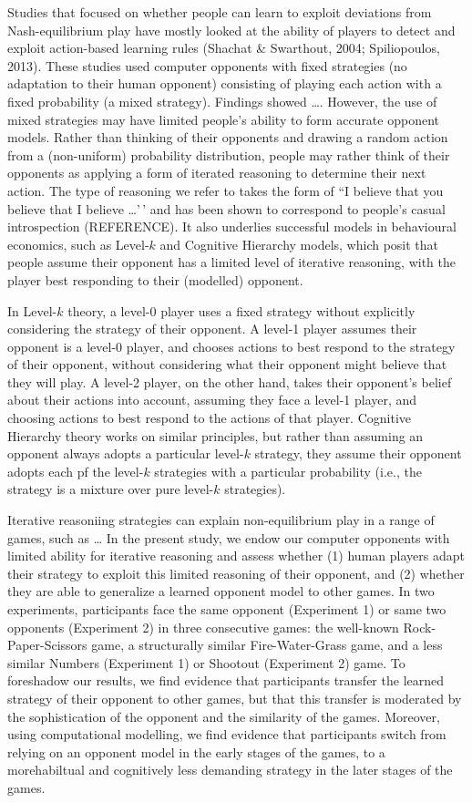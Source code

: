 \documentclass[
  english,
  man,floatsintext]{apa6}
\begin{document}
Studies that focused on whether people can learn to exploit deviations from Nash-equilibrium play have mostly looked at the ability of players to detect and exploit action-based learning rules (Shachat \& Swarthout, 2004; Spiliopoulos, 2013). These studies used computer opponents with fixed strategies (no adaptation to their human opponent) consisting of playing each action with a fixed probability (a mixed strategy). Findings showed \ldots. However, the use of mixed strategies may have limited people's ability to form accurate opponent models. Rather than thinking of their opponents and drawing a random action from a (non-uniform) probability distribution, people may rather think of their opponents as applying a form of iterated reasoning to determine their next action. The type of reasoning we refer to takes the form of ``I believe that you believe that I believe \ldots'\,' and has been shown to correspond to people's casual introspection (REFERENCE). It also underlies successful models in behavioural economics, such as Level-\(k\) and Cognitive Hierarchy models, which posit that people assume their opponent has a limited level of iterative reasoning, with the player best responding to their (modelled) opponent.

In Level-\(k\) theory, a level-0 player uses a fixed strategy without explicitly considering the strategy of their opponent. A level-1 player assumes their opponent is a level-0 player, and chooses actions to best respond to the strategy of their opponent, without considering what their opponent might believe that they will play. A level-2 player, on the other hand, takes their opponent's belief about their actions into account, assuming they face a level-1 player, and choosing actions to best respond to the actions of that player. Cognitive Hierarchy theory works on similar principles, but rather than assuming an opponent always adopts a particular level-\(k\) strategy, they assume their opponent adopts each pf the level-\(k\) strategies with a particular probability (i.e., the strategy is a mixture over pure level-\(k\) strategies).

Iterative reasoniing strategies can explain non-equilibrium play in a range of games, such as \ldots{} In the present study, we endow our computer opponents with limited ability for iterative reasoning and assess whether (1) human players adapt their strategy to exploit this limited reasoning of their opponent, and (2) whether they are able to generalize a learned opponent model to other games. In two experiments, participants face the same opponent (Experiment 1) or same two opponents (Experiment 2) in three consecutive games: the well-known Rock-Paper-Scissors game, a structurally similar Fire-Water-Grass game, and a less similar Numbers (Experiment 1) or Shootout (Experiment 2) game. To foreshadow our results, we find evidence that participants transfer the learned strategy of their opponent to other games, but that this transfer is moderated by the sophistication of the opponent and the similarity of the games. Moreover, using computational modelling, we find evidence that participants switch from relying on an opponent model in the early stages of the games, to a morehabiltual and cognitively less demanding strategy in the later stages of the games.
\end{document}
